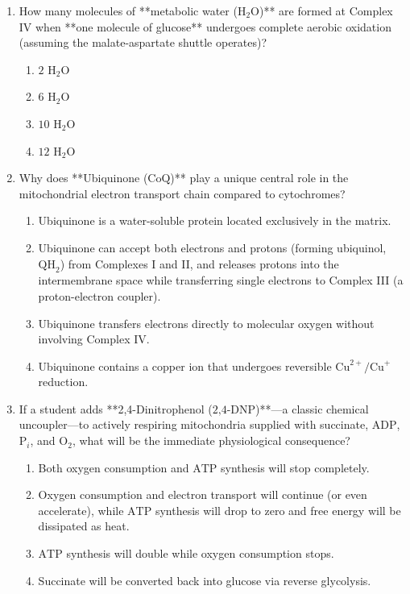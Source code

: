 \documentclass[11pt, a4paper]{article}
\begin{document}
\begin{enumerate}[label=\textbf{\arabic*.}]
\item How many molecules of **metabolic water ($\text{H}_2\text{O}$)** are formed at Complex IV when **one molecule of glucose** undergoes complete aerobic oxidation (assuming the malate-aspartate shuttle operates)?
\begin{enumerate}[label=(\Alph*)]
    \item $2\text{ H}_2\text{O}$
    \item $6\text{ H}_2\text{O}$
    \item $10\text{ H}_2\text{O}$
    \item $12\text{ H}_2\text{O}$
\end{enumerate}

\item Why does **Ubiquinone ($\text{CoQ}$)** play a unique central role in the mitochondrial electron transport chain compared to cytochromes?
\begin{enumerate}[label=(\Alph*)]
    \item Ubiquinone is a water-soluble protein located exclusively in the matrix.
    \item Ubiquinone can accept both electrons and protons (forming ubiquinol, $\text{QH}_2$) from Complexes I and II, and releases protons into the intermembrane space while transferring single electrons to Complex III (a proton-electron coupler).
    \item Ubiquinone transfers electrons directly to molecular oxygen without involving Complex IV.
    \item Ubiquinone contains a copper ion that undergoes reversible $\text{Cu}^{2+}/\text{Cu}^+$ reduction.
\end{enumerate}

\item If a student adds **2,4-Dinitrophenol ($\text{2,4-DNP}$)**—a classic chemical uncoupler—to actively respiring mitochondria supplied with succinate, $\text{ADP}$, $\text{P}_i$, and $\text{O}_2$, what will be the immediate physiological consequence?
\begin{enumerate}[label=(\Alph*)]
    \item Both oxygen consumption and $\text{ATP}$ synthesis will stop completely.
    \item Oxygen consumption and electron transport will continue (or even accelerate), while $\text{ATP}$ synthesis will drop to zero and free energy will be dissipated as heat.
    \item $\text{ATP}$ synthesis will double while oxygen consumption stops.
    \item Succinate will be converted back into glucose via reverse glycolysis.
\end{enumerate}


\end{enumerate}
\end{document}
